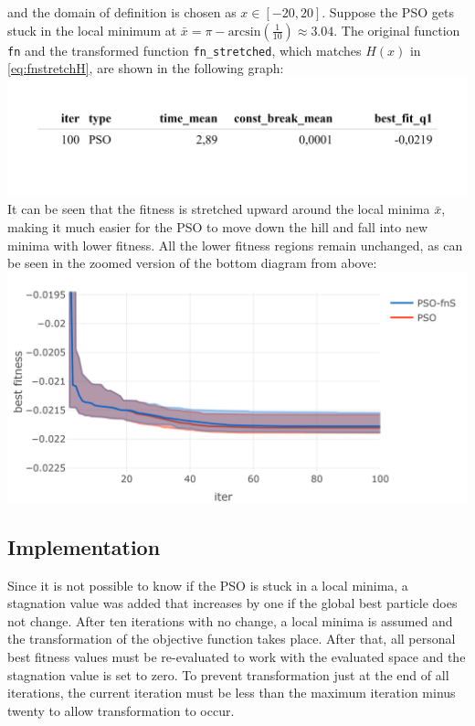 \documentclass[
  oneside]{book}
\begin{document}
and the domain of definition is chosen as \(x \in [-20, 20]\). Suppose the PSO gets stuck in the local minimum at \(\bar{x} = \pi - \text{arcsin}(\frac{1}{10}) \approx 3.04\). The original function \texttt{fn} and the transformed function \texttt{fn\_stretched}, which matches \(H(x)\) in \eqref{eq:fnstretchH}, are shown in the following graph:\\
\includegraphics{Master_Thesis_files/figure-latex/unnamed-chunk-9-1.png}
It can be seen that the fitness is stretched upward around the local minima \(\bar{x}\), making it much easier for the PSO to move down the hill and fall into new minima with lower fitness. All the lower fitness regions remain unchanged, as can be seen in the zoomed version of the bottom diagram from above:
\includegraphics{Master_Thesis_files/figure-latex/unnamed-chunk-10-1.png}

\hypertarget{implementation}{%
\subsection{Implementation}\label{implementation}}

Since it is not possible to know if the PSO is stuck in a local minima, a stagnation value was added that increases by one if the global best particle does not change. After ten iterations with no change, a local minima is assumed and the transformation of the objective function takes place. After that, all personal best fitness values must be re-evaluated to work with the evaluated space and the stagnation value is set to zero. To prevent transformation just at the end of all iterations, the current iteration must be less than the maximum iteration minus twenty to allow transformation to occur.
\end{document}
